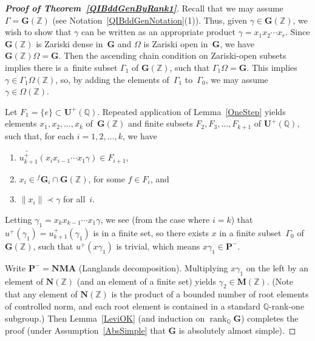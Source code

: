 \documentclass[11pt]{article}
\numberwithin{equation}{section}
\newcommand{\QQ}{\mathbb{Q}}
\newcommand{\ZZ}{\mathbb{Z}}
\newcommand{\Aa}{\mathbf{A}}
\newcommand{\Ga}{\mathbf{G}}
\newcommand{\Ma}{\mathbf{M}}
\newcommand{\Na}{\mathbf{N}}
\newcommand{\Pa}{\mathbf{P}}
\newcommand{\Ua}{\mathbf{U}}
\DeclareMathOperator{\rank}{rank}
\newcommand{\la}{\overleftarrow}
\numberwithin{equation}{section}
\theoremstyle{definition}
\begin{document}
\begin{proof}[\bf Proof of Theorem~\ref{QIBddGenByRank1}]
Recall that we may assume $\Gamma = \Ga(\ZZ)$ (see Notation~\ref{QIBddGenNotation}(1)).
Thus, given $\gamma \in \Ga(\ZZ)$, we wish to show that $\gamma$ can be written as an appropriate product $\gamma = x_1 x_2 \cdots x_r$. Since $\Ga(\ZZ)$ is Zariski dense in~$\Ga$ \cite[Theorem~4.10, p.~205]{MR1278263} and $\Omega$ is Zariski open in~$\Ga$, we have $\Ga(\ZZ) \Omega = \Ga$. Then the ascending chain condition on Zariski-open subsets implies there is a~finite subset $\Gamma_1$ of $\Ga(\ZZ)$, such that $\Gamma_1 \Omega = \Ga$. This implies $\gamma \in \Gamma_1 \Omega(\ZZ)$, so, by adding the elements of~$\Gamma_1$ to~$\Gamma_0$, we may assume $\gamma \in \Omega(\ZZ)$.

Let $F_1 = \{e\} \subset \Ua^+(\QQ)$. Repeated application of Lemma~\ref{OneStep} yields elements $x_1,x_2,\ldots,x_k$ of~$\Ga(\ZZ)$ and finite subsets $F_2, F_3,\ldots, F_{k+1}$ of $\Ua^+(\QQ)$, such that, for each $i = 1,2,\ldots,k$, we have
\begin{enumerate}\itemsep=0pt
\item[1)] $\la{u^+_{k+1}}(x_i x_{i-1} \cdots x_1 \gamma) \in F_{i+1}$,
\item[2)] $x_i \in {}^f \Ga_i \cap \Ga(\ZZ)$, for some $f \in F_{i}$, and
\item[3)] $\| x_i \| \prec \gamma$ for all~$i$.
	\end{enumerate}
Letting $\gamma_1 = x_k x_{k-1} \cdots x_1 \gamma$, we see (from the case where $i = k$) that $u^+(\gamma_1) = u^+_{k+1}(\gamma_1)$ is in a finite set, so there exists $x$ in a finite subset~$\Gamma_0$ of $\Ga(\ZZ)$, such that $u^+(x\gamma_1)$ is trivial, which means $x \gamma_1 \in \Pa^-$.

Write $\Pa^- = \Na \Ma \Aa$ (Langlands decomposition). Multiplying $x \gamma_1$ on the left by an element of $\Na(\ZZ)$ (and an element of a finite set) yields $\gamma_2 \in \Ma(\ZZ)$. (Note that any element of $\Na(\ZZ)$ is the product of a bounded number of root elements of controlled norm, and each root element is contained in a standard $\QQ$-rank-one subgroup.) Then Lemma~\ref{LeviOK} (and induction on $\rank_\QQ \Ga$) completes the proof (under Assumption~\ref{AbsSimple} that $\Ga$ is absolutely almost simple).
\end{proof}
\end{document}
